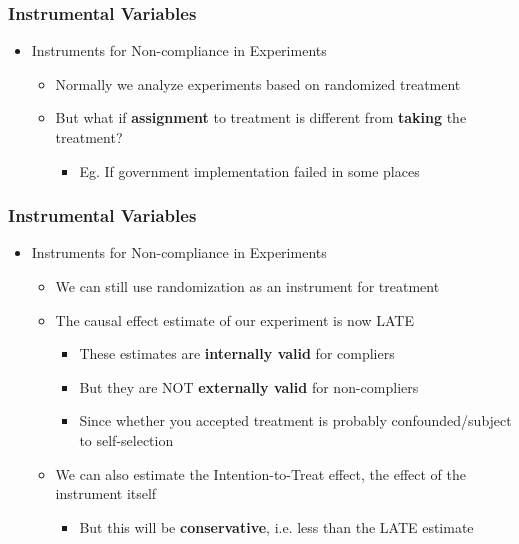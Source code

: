 \documentclass[xcolor=x11names,compress]{beamer}\usepackage[]{graphicx}\usepackage[]{color}
\renewcommand{\(}{\begin{columns}}
\renewcommand{\)}{\end{columns}}
\newcommand{\<}[1]{\begin{column}{#1}}
\renewcommand{\>}{\end{column}}
\begin{document}
\begin{frame}
\frametitle{Instrumental Variables}
\begin{itemize}
\item Instruments for Non-compliance in Experiments
\pause
\begin{itemize}
\item Normally we analyze experiments based on randomized treatment
\item But what if \textbf{assignment} to treatment is different from \textbf{taking} the treatment?
\begin{itemize}
\item Eg. If government implementation failed in some places
\end{itemize}
\end{itemize}
\end{itemize}
\end{frame}

\begin{frame}
\frametitle{Instrumental Variables}
\begin{itemize}
\item Instruments for Non-compliance in Experiments
\pause
\begin{itemize}
\item We can still use randomization as an instrument for treatment
\pause
\item The causal effect estimate of our experiment is now LATE
\begin{itemize}
\item These estimates are \textbf{internally valid} for compliers
\item But they are NOT \textbf{externally valid} for non-compliers
\item Since whether you accepted treatment is probably confounded/subject to self-selection
\end{itemize}
\item We can also estimate the Intention-to-Treat effect, the effect of the instrument itself
\begin{itemize}
\item But this will be \textbf{conservative}, i.e. less than the LATE estimate 
\end{itemize}
\end{itemize}
\end{itemize}
\end{frame}
\end{document}
